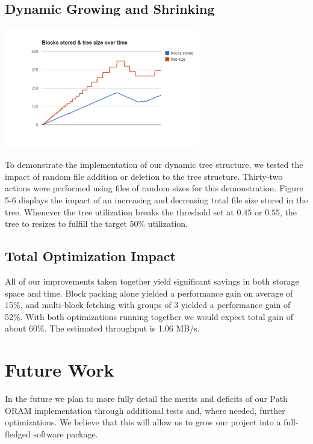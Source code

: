 \documentclass[conference]{IEEEtran}
\begin{document}
\subsection{Dynamic Growing and Shrinking}
\begin{center}
\noindent\includegraphics[width=8.5cm]{560.png}
\end{center}

To demonstrate the implementation of our dynamic tree structure, we tested the impact of random file addition or deletion to the tree structure. Thirty-two actions were performed using files of random sizes for this demonstration. Figure 5-6 displays the impact of an increasing and decreasing total file size stored in the tree. Whenever the tree utilization breaks the threshold set at $0.45$ or $0.55$, the tree to resizes to fulfill the target 50\% utilization.

\subsection{Total Optimization Impact}

All of our improvements taken together yield significant savings in both storage space and time. Block packing alone yielded a performance gain on average of 15\%, and multi-block fetching with groups of 3 yielded a performance gain of 52\%. With both optimizations running together we would expect total gain of about 60\%. The estimated throughput is 1.06 MB/s. 

\section{Future Work}

In the future we plan to more fully detail the merits and deficits of our Path ORAM implementation through additional tests and, where needed, further optimizations. We believe that this will allow us to grow our project into a full-fledged software package.
\end{document}
